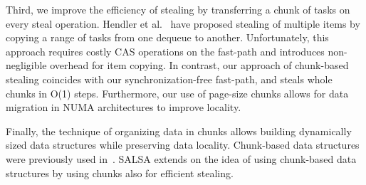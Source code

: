 Third, we improve the efficiency of stealing by transferring a chunk of tasks on every steal
operation. Hendler et al.~\cite{Hendler:2002:NSW:571825.571876} have proposed stealing of multiple
items by copying a range of tasks from one dequeue to another. Unfortunately, this approach requires
costly CAS operations on the fast-path and introduces non-negligible overhead for item copying. In
contrast, our approach of chunk-based stealing coincides with our synchronization-free fast-path,
and steals whole chunks in O(1) steps. Furthermore, our use of page-size chunks allows for data
migration in NUMA architectures to improve locality.

Finally, the technique of organizing data in chunks allows building dynamically sized data
structures while preserving data locality. Chunk-based data structures were previously used
in~\cite{Braginsky:2011:LLL:1946143.1946153, Gidenstam:2010:CLQ:1940234.1940266,
Hendler:2006:DNW:1160290.1160294, Sundell:2011:LAC:1989493.1989550}. SALSA extends on the idea of
using chunk-based data structures by using chunks also for efficient stealing.

